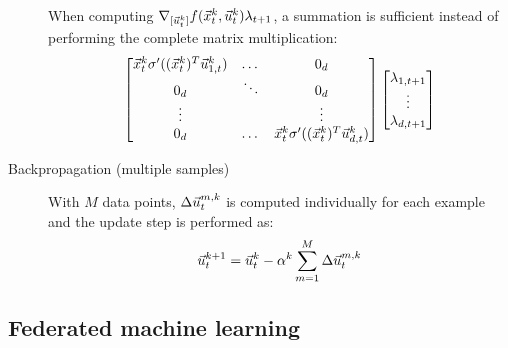 \begin{description}
        \begin{remark}
            When computing $\nabla_{[{\vec{u}}_t^k]} f({\vec{x}}_t^k, {\vec{u}}_t^k) \lambda_{t+1}$, a summation is sufficient instead of performing the complete matrix multiplication:
            \[
                \begin{bmatrix}
                    {\vec{x}}_t^k \sigma'(({\vec{x}}_t^k)^T {\vec{u}}_{1,t}^k) & \dots & 0_d \\
                    0_d & \ddots & 0_d \\
                    \vdots & &  \vdots \\
                    0_d & \dots & {\vec{x}}_t^k \sigma'(({\vec{x}}_t^k)^T {\vec{u}}_{d,t}^k)
                \end{bmatrix}
                \begin{bmatrix}
                    \lambda_{1,t+1} \\ \vdots \\ \lambda_{d,t+1}
                \end{bmatrix}
            \]
        \end{remark}

    \item[Backpropagation (multiple samples)] 
        With $M$ data points, $\Delta {\vec{u}}_t^{m,k}$ is computed individually for each example and the update step is performed as:
        \[
            {\vec{u}}_t^{k+1} = {\vec{u}}_t^k - \alpha^k \sum_{m=1}^{M} \Delta {\vec{u}}_t^{m,k}
        \]
\end{description}


\subsection{Federated machine learning}

